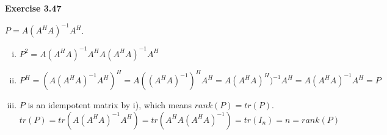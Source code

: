 \documentclass[letterpaper,12pt]{article}
\begin{document}
\textbf{Exercise 3.47}

$P = A(A^HA)^{-1}A^H$.

\begin{enumerate}[i.]
  \item $P^2 = A(A^HA)^{-1}A^H A(A^HA)^{-1}A^H$
  \item $P^H = (A(A^HA)^{-1}A^H)^H = A ((A^HA)^{-1})^H A^H
        = A (A^HA)^H)^{-1} A^H = A (A^HA)^{-1} A^H = P$
  \item $P$ is an idempotent matrix by i), which means $rank(P) =     tr(P)$.
        $$
        tr(P) = tr(A(A^HA)^{-1}A^H) = tr(A^HA(A^HA)^{-1}) = tr(I_n) = n = rank(P)
        $$
        
\end{enumerate}
\end{document}
